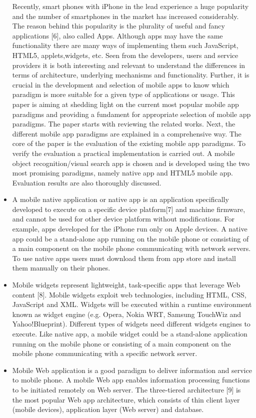 \begin{itemize}
        Recently, smart phones with iPhone in the lead experience a huge popularity and the number of smartphones in the market has increased considerably. The reason behind this popularity is the plurality of useful and fancy applications [6], also called Apps. Although apps may have the same functionality there are many ways of implementing them such JavaScript, HTML5, applets,widgets, etc. Seen from the developers, users and service providers it is both interesting and relevant to understand the differences in terms of architecture, underlying mechanisms and functionality. Further, it is crucial in the development and selection of mobile apps to know which paradigm is more suitable for a given type of applications or usage. This paper is aiming at shedding light on the current most popular mobile app paradigms and providing a fundament for appropriate selection of mobile app paradigms. The paper starts with reviewing the related works. Next, the different mobile app paradigms are explained in a comprehensive way. The core of the paper is the evaluation of the existing mobile app paradigms. To verify the evaluation a practical implementation is carried out. A mobile object recognition/visual search app is chosen and is developed using the two most promising paradigms, namely native app and HTML5 mobile app. Evaluation results are also thoroughly discussed. \cite{Mobile_App_Paradigms}
        \item
        A mobile native application or native app is an application specifically developed to execute on a specific device platform[7] and machine firmware, and cannot be used for other device platform without modifications. For example, apps developed for the iPhone run only on Apple devices. A native app could be a stand-alone app running on the mobile phone or consisting of a main component on the mobile phone communicating with network servers. To use native apps users must download them from app store and install them manually on their phones.\cite{Mobile_App_Paradigms}
        \item
        Mobile widgets represent lightweight, task-specific apps that leverage Web content [8]. Mobile widgets exploit web technologies, including HTML, CSS, JavaScript and XML. Widgets will be executed within a runtime environment known as widget engine (e.g. Opera, Nokia WRT, Samsung TouchWiz and Yahoo!Blueprint). Different types of widgets need different widgets engines to execute. Like native app, a mobile widget could be a stand-alone application running on the mobile phone or consisting of a main component on the mobile phone communicating with a specific network server.\cite{Mobile_App_Paradigms}
        \item
        Mobile Web application is a good paradigm to deliver information and service to mobile phone. A mobile Web app enables information processing functions to be initiated remotely on Web server. The three-tiered architecture [9] is the most popular Web app architecture, which consists of thin client layer (mobile devices), application layer (Web server) and database. \cite{Mobile_App_Paradigms}
        

\end{itemize}
